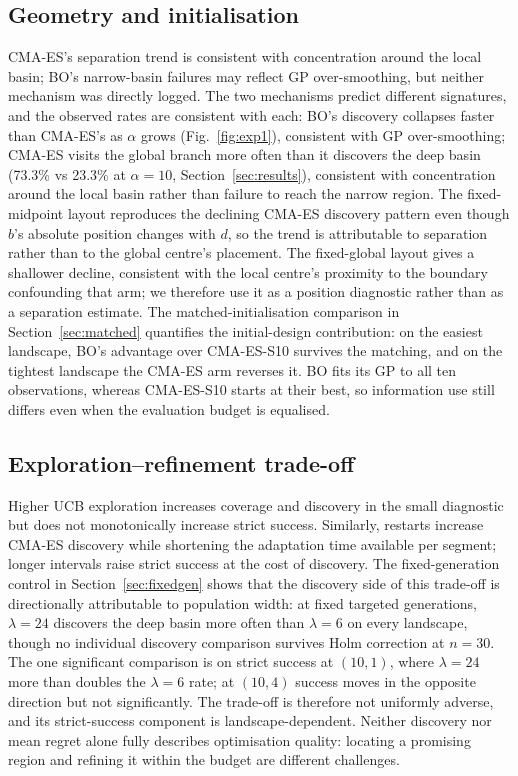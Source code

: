 \documentclass[11pt,a4paper]{article}
\begin{document}
\subsection{Geometry and initialisation}\label{sec:confounds}
CMA-ES's separation trend is consistent with concentration around the local basin; BO's narrow-basin failures may reflect GP over-smoothing, but neither mechanism was directly logged. The two mechanisms predict different signatures, and the observed rates are consistent with each: BO's discovery collapses faster than CMA-ES's as $\alpha$ grows (Fig.~\ref{fig:exp1}), consistent with GP over-smoothing; CMA-ES visits the global branch more often than it discovers the deep basin (73.3\% vs 23.3\% at $\alpha=10$, Section~\ref{sec:results}), consistent with concentration around the local basin rather than failure to reach the narrow region. The fixed-midpoint layout reproduces the declining CMA-ES discovery pattern even though $b$'s absolute position changes with $d$, so the trend is attributable to separation rather than to the global centre's placement. The fixed-global layout gives a shallower decline, consistent with the local centre's proximity to the boundary confounding that arm; we therefore use it as a position diagnostic rather than as a separation estimate. The matched-initialisation comparison in Section~\ref{sec:matched} quantifies the initial-design contribution: on the easiest landscape, BO's advantage over CMA-ES-S10 survives the matching, and on the tightest landscape the CMA-ES arm reverses it. BO fits its GP to all ten observations, whereas CMA-ES-S10 starts at their best, so information use still differs even when the evaluation budget is equalised.

\subsection{Exploration--refinement trade-off}\label{sec:explore}
Higher UCB exploration increases coverage and discovery in the small diagnostic but does not monotonically increase strict success. Similarly, restarts increase CMA-ES discovery while shortening the adaptation time available per segment; longer intervals raise strict success at the cost of discovery. The fixed-generation control in Section~\ref{sec:fixedgen} shows that the discovery side of this trade-off is directionally attributable to population width: at fixed targeted generations, $\lambda=24$ discovers the deep basin more often than $\lambda=6$ on every landscape, though no individual discovery comparison survives Holm correction at $n=30$. The one significant comparison is on strict success at $(10,1)$, where $\lambda=24$ more than doubles the $\lambda=6$ rate; at $(10,4)$ success moves in the opposite direction but not significantly. The trade-off is therefore not uniformly adverse, and its strict-success component is landscape-dependent. Neither discovery nor mean regret alone fully describes optimisation quality: locating a promising region and refining it within the budget are different challenges.
\end{document}
